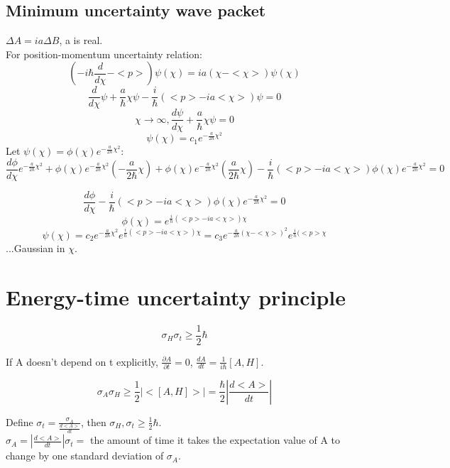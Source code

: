 \documentclass[12pt,a4paper]{article}
\begin{document}
\begin{itemize}
\pagebreak

\section{Minimum uncertainty wave packet}

$\Delta A = ia \Delta B$, a is real.\\
For position-momentum uncertainty relation:\\

\[
(- i \hbar \frac{d}{d \chi} - <p>) \psi (\chi)= ia (\chi -<\chi>) \psi (\chi)
\]
\[
\frac{d}{d\chi} \psi + \frac{a}{\hbar} \chi \psi -\frac{i}{\hbar}(<p> - ia<\chi>)\psi=0
\]
\[
\chi \to \infty, \frac{d \psi}{d \chi} + \frac{a}{\hbar} \chi \psi = 0
\]
\[
\psi (\chi) = c_1 e^{-\frac{a}{2 \hbar} \chi ^2}
\]
Let $\psi (\chi) = \phi (\chi) e^{-\frac{a}{2 \hbar} \chi ^2}$:
\[ 
\frac{d \phi }{d \chi} e^{-\frac{a}{2 \hbar} \chi ^2 } + \phi (\chi) e^{-\frac{a}{2 \hbar} \chi ^2} (- \frac{a}{2 \hbar} \chi) + \phi (\chi) e^{-\frac{a}{2 \hbar} \chi ^2} ( \frac{a}{2 \hbar} \chi)
-\frac{i}{\hbar} (<p>-ia<\chi>) \phi (\chi ) e^{-\frac{a}{2 \hbar} \chi ^2} =0
\]

\[ 
\frac{d \phi }{d \chi} 
-\frac{i}{\hbar} (<p>-ia<\chi >) \phi ( \chi ) e^{-\frac{a}{2 \hbar} \chi ^2} =0
\]
\[
\phi (\chi ) = e^{\frac{i}{\hbar} (<p>-ia<\chi > ) \chi }
\]
\[
\psi ( \chi ) = c_2 e^{-\frac{a}{2 \hbar} \chi ^2} e^{\frac{i}{\hbar} (<p>-ia<\chi > ) \chi }
= c_3 e^{-\frac{a}{2 \hbar} (\chi - <\chi >) ^2} e^{\frac{i}{\hbar} (<p> \chi}
\]
...Gaussian in $\chi$.

\end{itemize}

\section{Energy-time uncertainty principle}

\[
\sigma _H \sigma _t \geq \frac{1}{2} \hbar
\]

If A doesn't depend on t explicitly, $\frac{\partial A}{\partial t} = 0$, $\frac{dA}{dt}=\frac{1}{i \hbar} [A,H]$.

\[
\sigma _A \sigma _H \geq \frac{1}{2} | < [A,H]>| = \frac{\hbar}{2} | \frac{d <A>}{dt} |
\]

Define $\sigma _t = \frac{\sigma _A}{\frac{d<A>}{dt}}$, then $\sigma  _H, \sigma _t \geq \frac{1}{2} \hbar$.\\

$\sigma _A = | \frac{d<A>}{dt} | \sigma _t =$ the amount of time it takes the expectation value of A to change by one standard deviation of $\sigma _A$.
\end{document}
